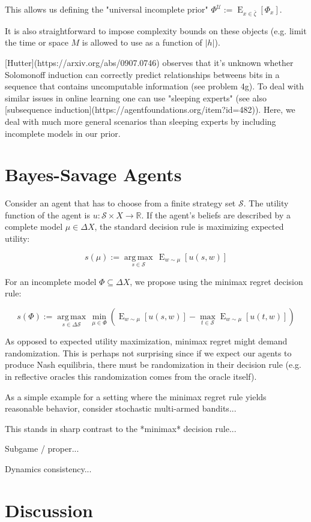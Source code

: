 \documentclass[a4paper]{article}
\DeclareMathOperator{\E}{E}
\newcommand{\Argmax}[1]{\underset{#1}{\operatorname{arg\,max}}\,}
\newcommand{\Reals}{\mathbb{R}}
\newcommand{\Abs}[1]{\lvert #1 \rvert}
\newcommand{\UTM}{\mathcal{U}}
\newcommand{\SP}[1]{\Delta #1}
\newcommand{\Strat}{\mathcal{S}}
\begin{document}
This allows us defining the "universal incomplete prior" ${\Phi^\UTM:=\E_{x \in \bar{\zeta}}[\Phi_x]}$.

It is also straightforward to impose complexity bounds on these objects (e.g. limit the time or space ${M}$ is allowed to use as a function of ${\Abs{h}}$).

[Hutter](https://arxiv.org/abs/0907.0746) observes that it's unknown whether Solomonoff induction can correctly predict relationships betweens bits in a sequence that contains uncomputable information (see problem 4g). To deal with similar issues in online learning one can use "sleeping experts" (see also [subsequence induction](https://agentfoundations.org/item?id=482)). Here, we deal with much more general scenarios than sleeping experts by including incomplete models in our prior.

\section{Bayes-Savage Agents}

Consider an agent that has to choose from a finite strategy set ${\Strat}$. The utility function of the agent is ${u: \Strat \times X \rightarrow \Reals}$. If the agent's beliefs are described by a complete model ${\mu \in \SP{X}}$, the standard decision rule is maximizing expected utility: 

$${s(\mu):=\Argmax{s \in \Strat} \E_{w \sim \mu}[u(s,w)]}$$

For an incomplete model ${\Phi \subseteq \SP{X}}$, we propose using the minimax regret decision rule:

$$s(\Phi):=\Argmax{s \in \SP{\Strat}} \min_{\mu \in \Phi}(\E_{w \sim \mu}[u(s,w)] - \max_{t \in \Strat} \E_{w \sim \mu}[u(t,w)])$$

As opposed to expected utility maximization, minimax regret might demand randomization. This is perhaps not surprising since if we expect our agents to produce Nash equilibria, there must be randomization in their decision rule (e.g. in reflective oracles this randomization comes from the oracle itself).

As a simple example for a setting where the minimax regret rule yields reasonable behavior, consider stochastic multi-armed bandits...

This stands in sharp contrast to the *minimax* decision rule...

Subgame / proper...

Dynamics consistency...

\section{Discussion}
\end{document}
